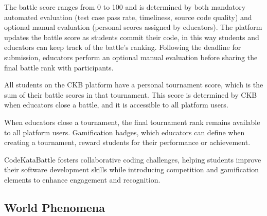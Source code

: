 The battle score ranges from 0 to 100 and is determined by both mandatory automated evaluation (test case pass rate, timeliness, source code quality) and optional manual evaluation (personal scores assigned by educators).
The platform updates the battle score as students commit their code, in this way students and educators can keep track of the battle's ranking.
Following the deadline for submission, educators perform an optional manual evaluation before sharing the final battle rank with participants.

All students on the CKB platform have a personal tournament score, which is the sum of their battle scores in that tournament.
This score is determined by CKB when educators close a battle, and it is accessible to all platform users.

When educators close a tournament, the final tournament rank remains available to all platform users.
Gamification badges, which educators can define when creating a tournament, reward students for their performance or achievement.

CodeKataBattle fosters collaborative coding challenges, helping students improve their software development skills while introducing competition and gamification elements to enhance engagement and recognition.

\subsection{World Phenomena}

